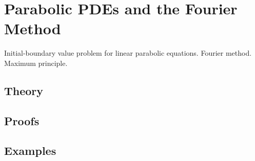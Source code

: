 
\section{Parabolic PDEs and the Fourier Method}
\label{sec:2.1.03-parabolic-fourier}

\begin{ticket}
Initial-boundary value problem for linear parabolic equations. Fourier method. Maximum principle.
\end{ticket}

\subsection*{Theory}

\subsection*{Proofs}

\subsection*{Examples}
